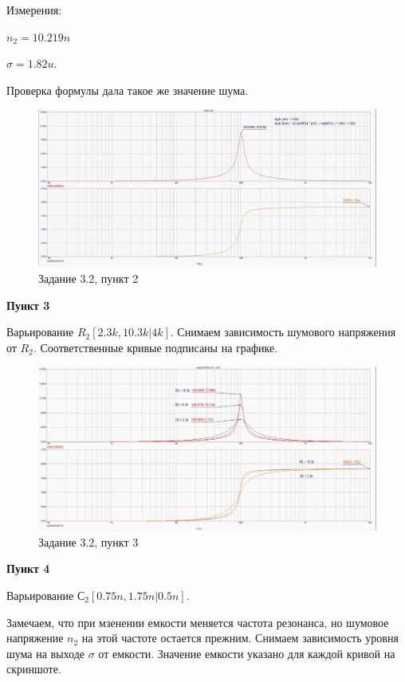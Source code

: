 \documentclass[a4paper, 14pt]{extarticle}%
\begin{document}
Измерения:

$n_2 = 10.219n$

$\sigma = 1.82u$.

Проверка формулы дала такое же значение шума.


\begin{figure}[h!]
			\centering
			\includegraphics[width=1.1\linewidth]{3/3_2_2.jpg}
			\caption{Задание 3.2, пункт 2}
			\label{A}
\end{figure}


\textbf{Пункт 3}


Варьирование $R_2[2.3k, 10.3k | 4k]$.
Снимаем зависимость шумового напряжения от $R_2$. Соответственные кривые подписаны на графике.

\begin{figure}[h!]
			\centering
			\includegraphics[width=1.1\linewidth]{3/3_2_5.jpg}
			\caption{Задание 3.2, пункт 3}
			\label{A}
\end{figure}

\textbf{Пункт 4}


Варьирование $С_2[0.75n, 1.75n | 0.5n]$.

Замечаем, что при мзенении емкости меняется частота резонанса, но шумовое напряжение $n_2$ на этой частоте остается прежним.
Снимаем зависимость уровня шума на выходе $\sigma$ от емкости.
Значение емкости указано для каждой кривой на скриншоте.
\end{document}
